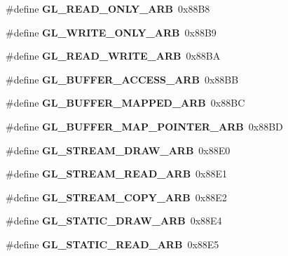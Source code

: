 \begin{DoxyCompactItemize}
\item 
\#define {\bfseries G\+L\+\_\+\+R\+E\+A\+D\+\_\+\+O\+N\+L\+Y\+\_\+\+A\+R\+B}~0x88\+B8\label{_s_d_l__opengl_8h_afd2a43c89320f8b77dc60bff0f0ff8ed}

\item 
\#define {\bfseries G\+L\+\_\+\+W\+R\+I\+T\+E\+\_\+\+O\+N\+L\+Y\+\_\+\+A\+R\+B}~0x88\+B9\label{_s_d_l__opengl_8h_a18ea1a5fccedc8a14d87c0849b5f47db}

\item 
\#define {\bfseries G\+L\+\_\+\+R\+E\+A\+D\+\_\+\+W\+R\+I\+T\+E\+\_\+\+A\+R\+B}~0x88\+B\+A\label{_s_d_l__opengl_8h_a6081beecc6dc9b99f3b321e029c4757e}

\item 
\#define {\bfseries G\+L\+\_\+\+B\+U\+F\+F\+E\+R\+\_\+\+A\+C\+C\+E\+S\+S\+\_\+\+A\+R\+B}~0x88\+B\+B\label{_s_d_l__opengl_8h_a853f4c607af437774c13275eb0b3e0fd}

\item 
\#define {\bfseries G\+L\+\_\+\+B\+U\+F\+F\+E\+R\+\_\+\+M\+A\+P\+P\+E\+D\+\_\+\+A\+R\+B}~0x88\+B\+C\label{_s_d_l__opengl_8h_a095119080825a1f803a87031750c7217}

\item 
\#define {\bfseries G\+L\+\_\+\+B\+U\+F\+F\+E\+R\+\_\+\+M\+A\+P\+\_\+\+P\+O\+I\+N\+T\+E\+R\+\_\+\+A\+R\+B}~0x88\+B\+D\label{_s_d_l__opengl_8h_af75d1ffa1ce8a2a75fce9f81384f6bc2}

\item 
\#define {\bfseries G\+L\+\_\+\+S\+T\+R\+E\+A\+M\+\_\+\+D\+R\+A\+W\+\_\+\+A\+R\+B}~0x88\+E0\label{_s_d_l__opengl_8h_ae37a7ed05a3194b55fdd38f0ab1ce05b}

\item 
\#define {\bfseries G\+L\+\_\+\+S\+T\+R\+E\+A\+M\+\_\+\+R\+E\+A\+D\+\_\+\+A\+R\+B}~0x88\+E1\label{_s_d_l__opengl_8h_af7ee8b15d3bc29b44d164d30af8259e5}

\item 
\#define {\bfseries G\+L\+\_\+\+S\+T\+R\+E\+A\+M\+\_\+\+C\+O\+P\+Y\+\_\+\+A\+R\+B}~0x88\+E2\label{_s_d_l__opengl_8h_ab8116c517fb5aa039889b208e2d0a5be}

\item 
\#define {\bfseries G\+L\+\_\+\+S\+T\+A\+T\+I\+C\+\_\+\+D\+R\+A\+W\+\_\+\+A\+R\+B}~0x88\+E4\label{_s_d_l__opengl_8h_a52d827f177e657db3ce0c6fdb33a94b7}

\item 
\#define {\bfseries G\+L\+\_\+\+S\+T\+A\+T\+I\+C\+\_\+\+R\+E\+A\+D\+\_\+\+A\+R\+B}~0x88\+E5\label{_s_d_l__opengl_8h_a35ca79d477fe20c1be752a615d373b89}


\end{DoxyCompactItemize}

